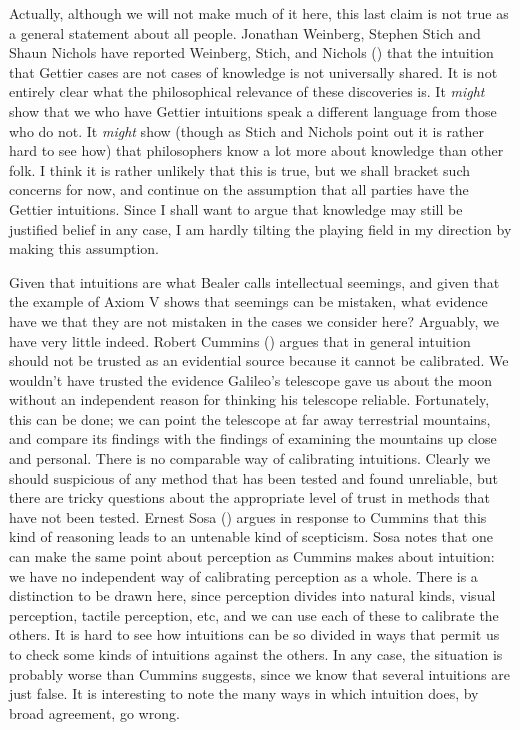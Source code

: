 \documentclass[
  11pt,
  letterpaper,
  DIV=11,
  numbers=noendperiod,
  twoside]{scrartcl}
\begin{document}
Actually, although we will not make much of it here, this last claim is
not true as a general statement about all people. Jonathan Weinberg,
Stephen Stich and Shaun Nichols have reported Weinberg, Stich, and
Nichols () that the intuition that
Gettier cases are not cases of knowledge is not universally shared. It
is not entirely clear what the philosophical relevance of these
discoveries is. It \emph{might} show that we who have Gettier intuitions
speak a different language from those who do not. It \emph{might} show
(though as Stich and Nichols point out it is rather hard to see how)
that philosophers know a lot more about knowledge than other folk. I
think it is rather unlikely that this is true, but we shall bracket such
concerns for now, and continue on the assumption that all parties have
the Gettier intuitions. Since I shall want to argue that knowledge may
still be justified belief in any case, I am hardly tilting the playing
field in my direction by making this assumption.

Given that intuitions are what Bealer calls intellectual seemings, and
given that the example of Axiom V shows that seemings can be mistaken,
what evidence have we that they are not mistaken in the cases we
consider here? Arguably, we have very little indeed. Robert Cummins
() argues that in general intuition
should not be trusted as an evidential source because it cannot be
calibrated. We wouldn't have trusted the evidence Galileo's telescope
gave us about the moon without an independent reason for thinking his
telescope reliable. Fortunately, this can be done; we can point the
telescope at far away terrestrial mountains, and compare its findings
with the findings of examining the mountains up close and personal.
There is no comparable way of calibrating intuitions. Clearly we should
suspicious of any method that has been tested and found unreliable, but
there are tricky questions about the appropriate level of trust in
methods that have not been tested. Ernest Sosa
() argues in response to Cummins that this
kind of reasoning leads to an untenable kind of scepticism. Sosa notes
that one can make the same point about perception as Cummins makes about
intuition: we have no independent way of calibrating perception as a
whole. There is a distinction to be drawn here, since perception divides
into natural kinds, visual perception, tactile perception, etc, and we
can use each of these to calibrate the others. It is hard to see how
intuitions can be so divided in ways that permit us to check some kinds
of intuitions against the others. In any case, the situation is probably
worse than Cummins suggests, since we know that several intuitions are
just false. It is interesting to note the many ways in which intuition
does, by broad agreement, go wrong.
\end{document}
